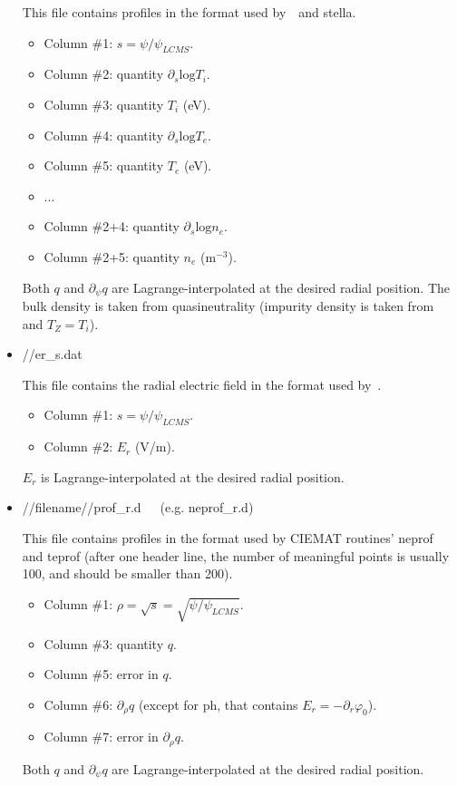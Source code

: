 \begin{itemize}
This file contains profiles in the format used by~\EUTERPE~and {\ttfamily stella}.
\begin{itemize}
\item Column \#1: $s=\psi/\psi_{LCMS}$.
\item Column \#2: quantity $\partial_s\mathrm{log}T_i$.
\item Column \#3: quantity $T_i$ (eV).
\item Column \#4: quantity $\partial_s\mathrm{log}T_e$.
\item Column \#5: quantity $T_e$ (eV).
\item ...
\item Column \#2+4: quantity $\partial_s\mathrm{log}n_e$.
\item Column \#2+5: quantity $n_e$ (m$^{-3}$).
\end{itemize}
Both $q$ and $\partial_\psi q$ are Lagrange-interpolated at the desired radial position. The bulk density is taken from quasineutrality (impurity density is taken from  and $T_Z=T_i$).


\item {\ttfamily //er\_s.dat}

This file contains the radial electric field in the format used by~\EUTERPE.
\begin{itemize}
\item Column \#1: $s=\psi/\psi_{LCMS}$.
\item Column \#2: $E_r$ (V/m).
\end{itemize}
$E_r$ is Lagrange-interpolated at the desired radial position. 


\item {\ttfamily //filename//prof\_r.d}~~~(e.g. {\ttfamily neprof\_r.d})

This file contains profiles in the format used by CIEMAT routines' {\ttfamily neprof}~\citep{milligen2011bayes} and {\ttfamily teprof} (after one header line, the number of meaningful points is usually 100, and should be smaller than 200). 
\begin{itemize}
\item Column \#1: $\rho=\sqrt{s}=\sqrt{\psi/\psi_{LCMS}}$.
\item Column \#3: quantity $q$.
\item Column \#5: error in $q$.
\item Column \#6: $\partial_\rho q$ (except for {\ttfamily ph}, that contains $E_r=-\partial_r\varphi_0$).
\item Column \#7: error in $\partial_\rho q$.
\end{itemize}
Both $q$ and $\partial_\psi q$ are Lagrange-interpolated at the desired radial position.


\end{itemize}
